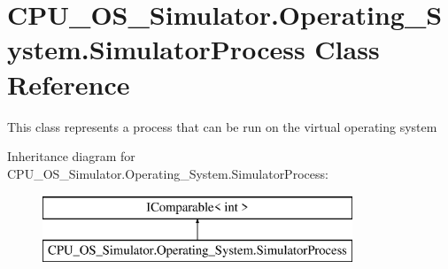 \hypertarget{class_c_p_u___o_s___simulator_1_1_operating___system_1_1_simulator_process}{}\section{C\+P\+U\+\_\+\+O\+S\+\_\+\+Simulator.\+Operating\+\_\+\+System.\+Simulator\+Process Class Reference}
\label{class_c_p_u___o_s___simulator_1_1_operating___system_1_1_simulator_process}


This class represents a process that can be run on the virtual operating system  


Inheritance diagram for C\+P\+U\+\_\+\+O\+S\+\_\+\+Simulator.\+Operating\+\_\+\+System.\+Simulator\+Process\+:\begin{figure}[H]
\begin{center}
\leavevmode
\includegraphics[height=2.000000cm]{class_c_p_u___o_s___simulator_1_1_operating___system_1_1_simulator_process}
\end{center}
\end{figure}
